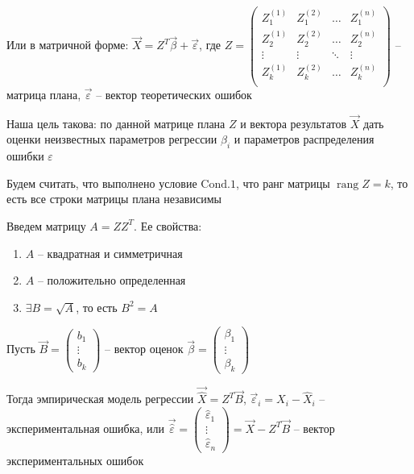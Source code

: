 \begin{enumerate}
    Или в матричной форме: $\vec X = Z^T \vec \beta + \vec \varepsilon$, 
    где $Z = \begin{pmatrix}
        Z_1^{(1)} & Z_1^{(2)} & \dots & Z_1^{(n)} \\ 
        Z_2^{(1)} & Z_2^{(2)} & \dots & Z_2^{(n)} \\ 
        \vdots & \vdots & \ddots & \vdots \\
        Z_k^{(1)} & Z_k^{(2)} & \dots & Z_k^{(n)} \\ 
    \end{pmatrix}$ -- матрица плана, $\vec \varepsilon$ -- вектор теоретических ошибок

    Наша цель такова: по данной матрице плана $Z$ и вектора результатов $\vec X$ дать оценки неизвестных параметров регрессии $\beta_i$ 
    и параметров распределения ошибки $\varepsilon$

    Будем считать, что выполнено условие $\mathrm{Cond. 1}$, что ранг матрицы $\operatorname{rang} Z = k$, то есть все строки матрицы плана независимы

    Введем матрицу $A = Z Z^T$. Ее свойства:

    \begin{enumerate}
        \item $A$ -- квадратная и симметричная
        \item $A$ -- положительно определенная
        \item $\exists B = \sqrt{A}$, то есть $B^2 = A$
    \end{enumerate}

    Пусть $\vec B = \begin{pmatrix}b_1 \\ \vdots \\ b_k\end{pmatrix}$ -- вектор оценок $\vec \beta = \begin{pmatrix}\beta_1 \\ \vdots \\ \beta_k\end{pmatrix}$

    Тогда эмпирическая модель регрессии $\vec{\hat X} = Z^T \vec B$, 
    $\vec \varepsilon_i = X_i - \hat X_i$ -- экспериментальная ошибка, или $\vec {\hat \varepsilon} = \begin{pmatrix}\hat \varepsilon_1 \\ \vdots \\ \hat \varepsilon_n\end{pmatrix} = \vec X - Z^T \vec B$ -- вектор экспериментальных ошибок


\end{enumerate}
